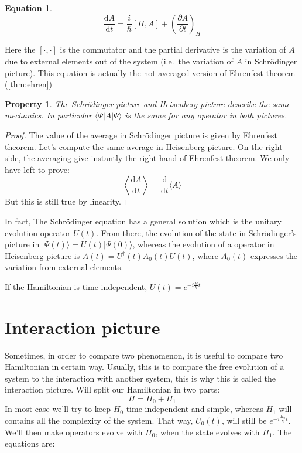 \documentclass[10pt,a4paper]{report}
\theoremstyle{plain}
\newtheorem{prop}[thm]{Property}
\theoremstyle{definition}
\newtheorem{eqn}[thm]{Equation}
\theoremstyle{remark}
\newcommand{\ket}[1]{|#1\rangle}
\newcommand{\bra}[1]{\langle#1|}
\newcommand{\dd}{\mathrm{d}}
\newcommand{\der}[2]{\frac{\dd{#1}}{\dd{#2}}}
\newcommand{\dpar}[2]{\frac{\partial{#1}}{\partial{#2}}}
\begin{document}
\begin{eqn}
  \[\der At   = \frac i {\hbar}[H,A] + {\left(\dpar At \right)}_{\!\!H}\]
\end{eqn}

Here the $[\cdot,\cdot]$ is the commutator and the partial derivative is the
variation of $A$ due to external elements out of the system (i.e.~the variation
of $A$ in Schrödinger picture). This equation is actually the not-averaged version
of Ehrenfest theorem (\ref{thm:ehren})

\begin{prop}
  The Schrödinger picture and Heisenberg picture describe the same mechanics. In
  particular $\bra \Psi A \ket \Psi$ is the same for any operator in both pictures.
\end{prop}

\begin{proof}
  The value of the average in Schrödinger picture is given by Ehrenfest theorem.
  Let's compute the same average in Heisenberg picture. On the right side, the
  averaging give instantly the right hand of Ehrenfest theorem. We only have
  left to prove:
  \[ \left \langle \der A t\right\rangle = \der{}t\langle A\rangle\]
  But this is still true by linearity.
\end{proof}

In fact, The Schrödinger equation has a general solution which is the unitary evolution
operator $U(t)$. From there, the evolution of the state in Schrödinger's picture
in $\ket {\Psi(t)} = U(t) \ket {\Psi(0)}$, whereas the evolution of a operator
in Heisenberg picture is $A(t) = U^\dagger(t)A_0(t)U(t)$, where $A_0(t)$
expresses the variation from external elements.

If the Hamiltonian is time-independent, $U(t) = e^{-i\frac H\hbar t}$

\section{Interaction picture}

Sometimes, in order to compare two phenomenon, it is useful to compare two
Hamiltonian in certain way. Usually, this is to compare the free evolution of a
system to the interaction with another system, this is why this is called the
interaction picture. Will split our Hamiltonian in two parts:
\[H = H_0 + H_1\]
In most case we'll try to keep $H_0$ time independent and simple, whereas $H_1$
will contains all the complexity of the system. That way, $U_0(t)$, will still be
$e^{-i\frac {H_0}\hbar t}$. We'll then make operators evolve with $H_0$, when
the state evolves with $H_1$. The equations are:
\end{document}
